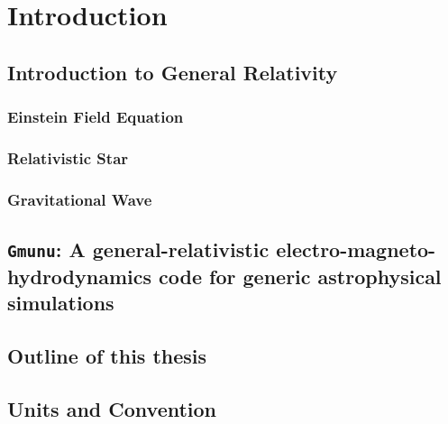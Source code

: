 
\chapter{Introduction}  %

\ifpdf
    \graphicspath{{Chapter1/Figs/Raster/}{Chapter1/Figs/PDF/}{Chapter1/Figs/}}
\else
    \graphicspath{{Chapter1/Figs/Vector/}{Chapter1/Figs/}}
\fi


\section{Introduction to General Relativity} %
\label{section1.1}

\subsection{Einstein Field Equation} %
\label{section1.1.1}

\subsection{Relativistic Star} %
\label{section1.1.2}

\subsection{Gravitational Wave} %
\label{section1.1.3}

\section{\texttt{Gmunu}: A general-relativistic electro-magneto-hydrodynamics code for generic astrophysical simulations} %

\section{Outline of this thesis}  %
\label{section1.3}

\section{Units and Convention}  %
\label{section1.4}

